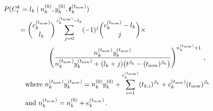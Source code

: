\documentclass[authoryear]{elsarticle}
\renewcommand{\vec}[1]{{\bm#1}}
\newcommand{\uz}{^{(0)}} %
\def\ykz{y\uz_k}
\def\nkz{n\uz_k}
\def\yknow{y_k^{(\tnow)}}
\def\nknow{n_k^{(\tnow)}}
\def\tnow{t_\text{now}}
\def\eknow{e_k^{(\tnow)}}
\def\cknow{c_k^{(\tnow)}}
\def\vectknow{\vec{t}_k^{(\tnow)}}
\begin{document}
\begin{align}
\label{eq:postpred-priorparams}
\lefteqn{P(C^k_t = l_k\mid\nkz,\ykz, \vectknow)}\hspace*{5ex} \nonumber\\
 &= { \cknow \choose l_k} \sum_{j=0}^{\cknow - l_k} (-1)^j { \cknow - l_k \choose j} \times \nonumber\\ & \hspace*{10ex}
    \left(\frac{\nknow\yknow}{\nknow\yknow + (l_k + j) \big(t^{\beta_k} - (\tnow)^{\beta_k}\big)}\right)^{\nknow + 1} \,, \\
 & \quad\text{where } \nknow\yknow = \nkz\ykz + \sum_{i=1}^{\eknow} (t_{k,i})^{\beta_k} + \cknow (\tnow)^{\beta_k} \nonumber\\
 & \quad\text{and }  \nknow = \nkz + \eknow \,. \nonumber
\end{align}
\end{document}
